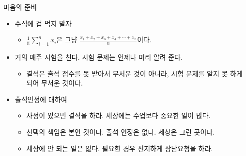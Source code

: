 \begin{frame}{마음의 준비}

\begin{itemize}
\item 수식에 겁 먹지 말자
	\begin{itemize}
		\item $ \frac{1}{n} \sum_{i=1}^{n} x_i $은 그냥 $ \frac{x_1 + x_2 + x_3 + x_4 + \cdots + x_n}{n}$이다. 
	\end{itemize}
\item 거의 매주 시험을 친다. 시험 문제는 언제나 미리 알려 준다. 
	\begin{itemize}
		\item 결석은 출석 점수를 못 받아서 무서운 것이 아니라, 시험 문제를 알지 못 하게 되어 무서운 것이다.
	\end{itemize}
\item 출석인정에 대하여
	\begin{itemize}
		\item 사정이 있으면 결석을 하라. 세상에는 수업보다 중요한 일이 많다.
		\item 선택의 책임은 본인 것이다. 출석 인정은 없다. 세상은 그런 곳이다.
		\item 세상에 안 되는 일은 없다. 필요한 경우 진지하게 상담요청을 하라.
	\end{itemize}
\end{itemize}

\end{frame}

